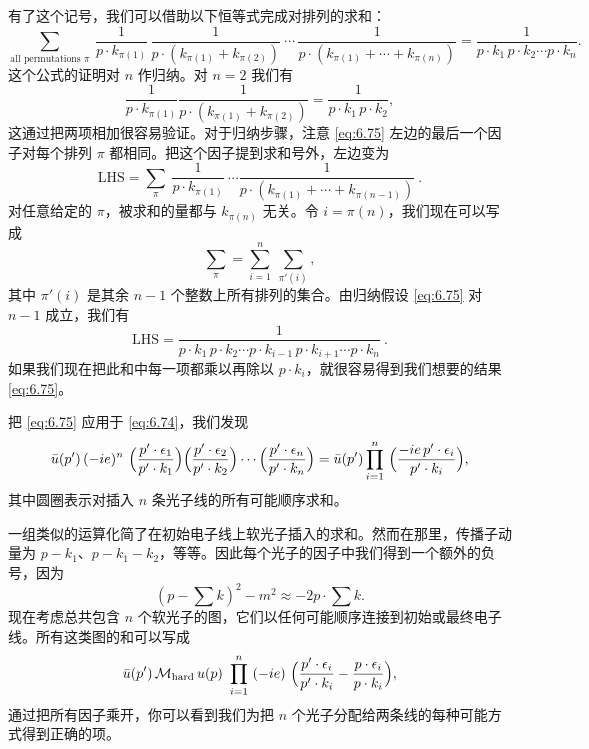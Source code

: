 有了这个记号，我们可以借助以下恒等式完成对排列的求和：
\begin{equation}
  \sum_{\text{all permutations }\pi}\ \frac{1}{p\cdot k_{\pi(1)}}\,
    \frac{1}{p\cdot(k_{\pi(1)}+k_{\pi(2)})}\ \cdots\,
    \frac{1}{p\cdot(k_{\pi(1)}+\cdots+k_{\pi(n)})}
  = \frac{1}{p\cdot k_1\,p\cdot k_2\cdots p\cdot k_n} .
  \label{eq:6.75}
\end{equation}
这个公式的证明对 $n$ 作归纳。对 $n=2$ 我们有
\begin{equation}
  \frac{1}{p\cdot k_{\pi(1)}}\frac{1}{p\cdot(k_{\pi(1)}+k_{\pi(2)})}
  = \frac{1}{p\cdot k_1\,p\cdot k_2},
\end{equation}
这通过把两项相加很容易验证。对于归纳步骤，注意 \eqref{eq:6.75} 左边的最后一个因子对每个排列 $\pi$ 都相同。把这个因子提到求和号外，左边变为
\begin{equation}
  \text{LHS} = \sum_{\pi}\ \frac{1}{p\cdot k_{\pi(1)}}\ \cdots
    \frac{1}{p\cdot(k_{\pi(1)}+\cdots+k_{\pi(n-1)})}\ .
\end{equation}
对任意给定的 $\pi$，被求和的量都与 $k_{\pi(n)}$ 无关。令 $i = \pi(n)$，我们现在可以写成
\begin{equation}
  \sum_{\pi} = \sum_{i=1}^{n}\ \sum_{\pi'(i)},
\end{equation}
其中 $\pi'(i)$ 是其余 $n-1$ 个整数上所有排列的集合。由归纳假设 \eqref{eq:6.75} 对 $n-1$ 成立，我们有
\begin{equation}
  \text{LHS} = \frac{1}{p\cdot k_1\,p\cdot k_2\cdots p\cdot k_{i-1}\,
    p\cdot k_{i+1}\cdots p\cdot k_n}\ .
\end{equation}
如果我们现在把此和中每一项都乘以再除以 $p\cdot k_i$，就很容易得到我们想要的结果 \eqref{eq:6.75}。

把 \eqref{eq:6.75} 应用于 \eqref{eq:6.74}，我们发现
\begin{equation}
  \bar{u}(p')\,(-ie)^n\ \Bigl( \frac{p'\cdot\epsilon_1}{p'\cdot k_1}
    \Bigr)\Bigl( \frac{p'\cdot\epsilon_2}{p'\cdot k_2} \Bigr)\cdots
    \Bigl( \frac{p'\cdot\epsilon_n}{p'\cdot k_n} \Bigr)
  = \bar{u}(p')\prod_{i=1}^{n}\ \Bigl( \frac{-ie\,p'\cdot\epsilon_i}
    {p'\cdot k_i} \Bigr),
  \label{eq:6.76}
\end{equation}
其中圆圈表示对插入 $n$ 条光子线的所有可能顺序求和。

一组类似的运算化简了在初始电子线上软光子插入的求和。然而在那里，传播子动量为 $p-k_1$、$p-k_1-k_2$，等等。因此每个光子的因子中我们得到一个额外的负号，因为
\begin{equation}
  (p-\textstyle\sum k)^2 - m^2 \approx -2p\cdot\textstyle\sum k .
\end{equation}
现在考虑总共包含 $n$ 个软光子的图，它们以任何可能顺序连接到初始或最终电子线。所有这类图的和可以写成
\begin{equation}
  \bar{u}(p')\,\mathcal{M}_{\mathrm{hard}}\,u(p)\ \prod_{i=1}^{n}\ (-ie)\
    \Bigl( \frac{p'\cdot\epsilon_i}{p'\cdot k_i} - \frac{p\cdot\epsilon_i}
      {p\cdot k_i} \Bigr),
  \label{eq:6.77}
\end{equation}
通过把所有因子乘开，你可以看到我们为把 $n$ 个光子分配给两条线的每种可能方式得到正确的项。


